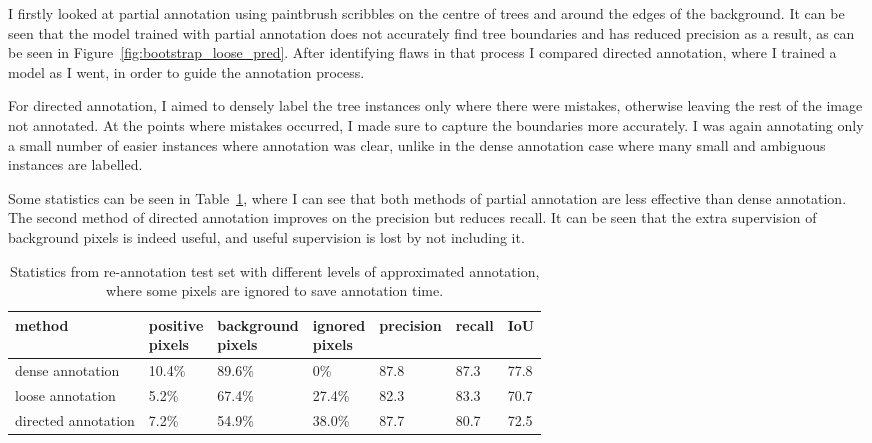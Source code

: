 I firstly looked at partial annotation using paintbrush scribbles on the centre of trees and around the edges of the background. It can be seen that the model trained with partial annotation does not accurately find tree boundaries and has reduced precision as a result, as can be seen in Figure~\ref{fig:bootstrap_loose_pred}. After identifying flaws in that process I compared directed annotation, where I trained a model as I went, in order to guide the annotation process.

For directed annotation, I aimed to densely label the tree instances only where there were mistakes, otherwise leaving the rest of the image not annotated. At the points where mistakes occurred, I made sure to capture the boundaries more accurately. I was again annotating only a small number of easier instances where annotation was clear, unlike in the dense annotation case where many small and ambiguous instances are labelled.

Some statistics can be seen in Table~\ref{tab:loose_exp}, where I can see that both methods of partial annotation are less effective than dense annotation. The second method of directed annotation improves on the precision but reduces recall. It can be seen that the extra supervision of background pixels is indeed useful, and useful supervision is lost by not including it.


\begin{table}[!ht]
  \centering
    \caption{Statistics from re-annotation test set with different levels of approximated annotation, where some pixels are ignored to save annotation time. }
    
  \begin{tabular}{ l  l  l l l l l }
    method & \shortstack{positive \\ pixels}  & \shortstack{background \\ pixels} & \shortstack{ignored \\ pixels} & precision & recall & IoU  \\
    \toprule
    dense annotation    & 10.4\% & 89.6\% & 0\% & 87.8 & 87.3 & 77.8 \\
    loose annotation    & 5.2\% & 67.4\% & 27.4\% & 82.3 & 83.3 & 70.7 \\
    directed annotation & 7.2\% & 54.9\% & 38.0\% & 87.7 & 80.7 & 72.5 \\    
    \bottomrule
  \end{tabular}

\label{tab:loose_exp}
\end{table}

